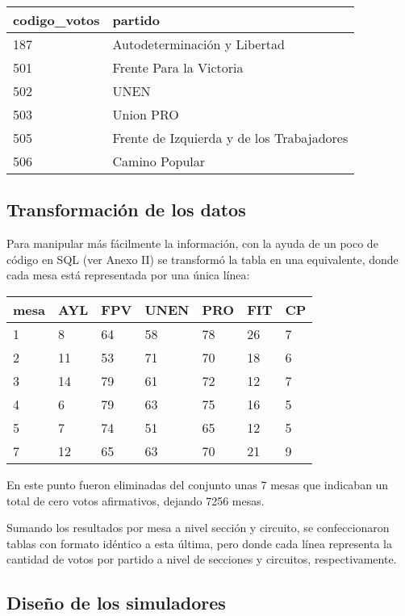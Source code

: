 \documentclass[12pt, a4paper]{article}
\begin{document}
\begin{center}
	\begin{tabular}{ll}
		codigo\_votos & partido \\ \hline
		   187 & Autodeterminaci\'on y Libertad\\
		   501 & Frente Para la Victoria \\
		   502 & UNEN \\
		   503 & Union PRO \\
		   505 & Frente de Izquierda y de los Trabajadores \\
		   506 & Camino Popular \\
	\end{tabular}
\end{center}
 
\subsection{Transformaci\'on de los datos}

Para manipular m\'as f\'acilmente la informaci\'on, con la ayuda de un poco de c\'odigo en SQL (ver Anexo II) se transform\'o la tabla en una equivalente, donde cada mesa est\'a representada por una \'unica l\'inea:

\begin{center}
	\begin{tabular}{l | llllll}
mesa & AYL & FPV & UNEN & PRO & FIT & CP \\ \hline
1 & 8 & 64 & 58 & 78 & 26 & 7 \\
2 & 11 & 53 & 71 & 70 & 18 & 6 \\
3 & 14 & 79 & 61 & 72 & 12 & 7 \\
4 & 6 & 79 & 63 & 75 & 16 & 5 \\
5 & 7 & 74 & 51 & 65 & 12 & 5 \\
7 & 12 & 65 & 63 & 70 & 21 & 9 \\
	\end{tabular}
\end{center}

En este punto fueron eliminadas del conjunto unas 7 mesas que indicaban un total de cero votos afirmativos, dejando 7256 mesas.

Sumando los resultados por mesa a nivel secci\'on y circuito, se confeccionaron tablas con formato id\'entico a esta \'ultima, pero donde cada l\'inea representa la cantidad de votos por partido a nivel de secciones y circuitos, respectivamente.

\subsection{Dise\~no de los simuladores}
\end{document}
